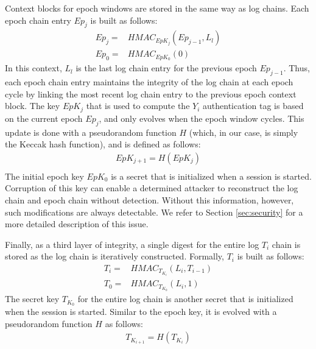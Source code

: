 \documentclass{sig-alternate}
\begin{document}


Context blocks for epoch windows are stored in the same way as log chains.
Each epoch chain entry $Ep_j$ is built as follows:
\begin{align*}
Ep_j = & HMAC_{EpK_{j}}(Ep_{j - 1}, L_{l}) \\
Ep_0 = & HMAC_{EpK_{0}}(0)
\end{align*}
In this context, $L_{l}$ is the last log chain entry for the previous epoch $Ep_{j - 1}$.
Thus, each epoch chain entry maintains the integrity of the log chain at each epoch cycle
by linking the most recent log chain entry to the previous epoch context block.
The key $EpK_{j}$ that is used to compute the $Y_i$ authentication tag is
based on the current epoch $Ep_j$, and only evolves when the epoch window cycles. 
This update is done with a pseudorandom function $H$ (which,
in our case, is simply the Keccak hash function), and is defined as follows:
\begin{align*}
EpK_{j + 1} = H(EpK_{j}) \\
\end{align*}
The initial epoch key $EpK_0$ is a secret that is initialized when a session
is started. Corruption of this key can enable a determined attacker to reconstruct
the log chain and epoch chain without detection. Without this information, however,
such modifications are always detectable. We refer to Section \ref{sec:security} for
a more detailed description of this issue.

Finally, as a third layer of integrity, a single digest for the entire log $T_i$
chain is stored as the log chain is iteratively constructed. Formally, $T_i$ is
built as follows:
\begin{align*}
T_i = & HMAC_{T_{K_{i}}}(L_{i}, T_{i - 1}) \\
T_0 = & HMAC_{T_{K_{0}}}(L_{i}, 1) %
\end{align*}
The secret key $T_{K_{0}}$ for the entire log chain is another secret that is
initialized when the session is started. Similar to the epoch key, it is evolved
with a pseudorandom function $H$ as follows:
\begin{align*}
T_{K_{i + 1}} = H(T_{K_{i}})
\end{align*}
\end{document}
